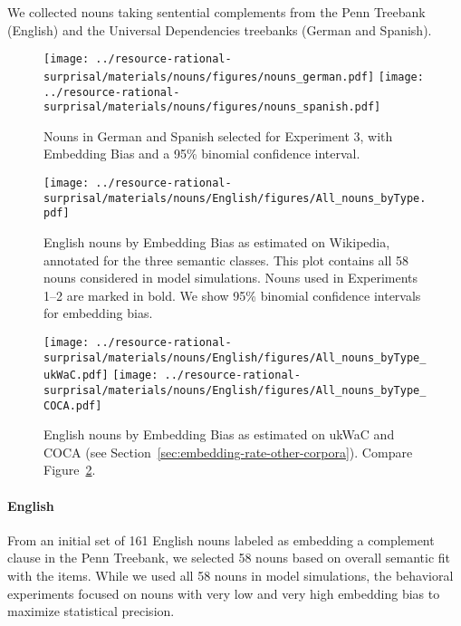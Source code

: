 We collected nouns taking sentential complements from the Penn Treebank (English) and the Universal Dependencies treebanks (German and Spanish).



\begin{figure}
    \centering
    \texttt{[image: ../resource-rational-surprisal/materials/nouns/figures/nouns\_german.pdf]}
    \texttt{[image: ../resource-rational-surprisal/materials/nouns/figures/nouns\_spanish.pdf]}

	\caption{Nouns in German and Spanish selected for Experiment 3, with Embedding Bias and a 95\% binomial confidence interval.}
    \label{fig:german-spanish-nouns}
\end{figure}



\begin{figure}
	\centering
	\texttt{[image: ../resource-rational-surprisal/materials/nouns/English/figures/All\_nouns\_byType.pdf]}

	\caption{English nouns by Embedding Bias as estimated on Wikipedia, annotated for the three semantic classes. This plot contains all 58 nouns considered in model simulations. Nouns used in Experiments 1--2 are marked in bold. We show 95\% binomial confidence intervals for embedding bias.}\label{fig:english-nouns}
\end{figure}



\begin{figure}
	\centering
	\texttt{[image: ../resource-rational-surprisal/materials/nouns/English/figures/All\_nouns\_byType\_ukWaC.pdf]}
	\texttt{[image: ../resource-rational-surprisal/materials/nouns/English/figures/All\_nouns\_byType\_COCA.pdf]}

	\caption{English nouns by Embedding Bias as estimated on ukWaC and COCA (see Section~\ref{sec:embedding-rate-other-corpora}). Compare Figure~\ref{fig:english-nouns}.}\label{fig:english-nouns-ukwac-coca}
\end{figure}



\paragraph{English}
From an initial set of 161 English nouns labeled as embedding a complement clause in the Penn Treebank, we selected 58 nouns based on overall semantic fit with the items.
While we used all 58 nouns in model simulations, the behavioral experiments focused on nouns with very low and very high embedding bias to maximize statistical precision.

